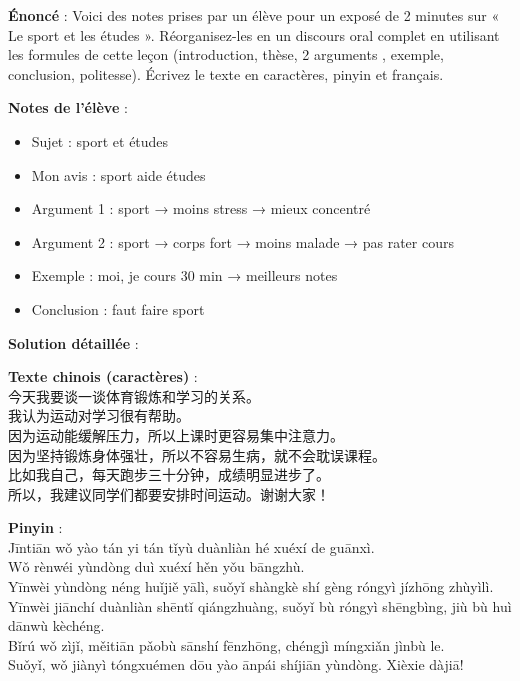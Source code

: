 \documentclass[11pt]{article}
\newcommand{\zh}[1]{\ifmmode\text{#1}\else{#1}\fi}
\begin{document}
\begin{exoresolu}
\textbf{Énoncé} : Voici des notes prises par un élève pour un exposé de 2 minutes sur « Le sport et les études ». Réorganisez-les en un discours oral complet en utilisant les formules de cette leçon (introduction, thèse, 2 arguments \zh{因为…所以…}, exemple, conclusion, politesse). Écrivez le texte en caractères, pinyin et français.

\textbf{Notes de l'élève} :
\begin{itemize}
    \item Sujet : sport et études
    \item Mon avis : sport aide études
    \item Argument 1 : sport → moins stress → mieux concentré
    \item Argument 2 : sport → corps fort → moins malade → pas rater cours
    \item Exemple : moi, je cours 30 min → meilleurs notes
    \item Conclusion : faut faire sport
\end{itemize}

\textbf{Solution détaillée} :

\textbf{Texte chinois (caractères)} :\\
今天我要谈一谈体育锻炼和学习的关系。\\
我认为运动对学习很有帮助。\\
因为运动能缓解压力，所以上课时更容易集中注意力。\\
因为坚持锻炼身体强壮，所以不容易生病，就不会耽误课程。\\
比如我自己，每天跑步三十分钟，成绩明显进步了。\\
所以，我建议同学们都要安排时间运动。谢谢大家！

\textbf{Pinyin} :\\
Jīntiān wǒ yào tán yi tán tǐyù duànliàn hé xuéxí de guānxì.\\
Wǒ rènwéi yùndòng duì xuéxí hěn yǒu bāngzhù.\\
Yīnwèi yùndòng néng huǐjiě yālì, suǒyǐ shàngkè shí gèng róngyì jízhōng zhùyìlì.\\
Yīnwèi jiānchí duànliàn shēntǐ qiángzhuàng, suǒyǐ bù róngyì shēngbìng, jiù bù huì dānwù kèchéng.\\
Bǐrú wǒ zìjǐ, měitiān pǎobù sānshí fēnzhōng, chéngjì míngxiǎn jìnbù le.\\
Suǒyǐ, wǒ jiànyì tóngxuémen dōu yào ānpái shíjiān yùndòng. Xièxie dàjiā!


\end{exoresolu}
\end{document}
